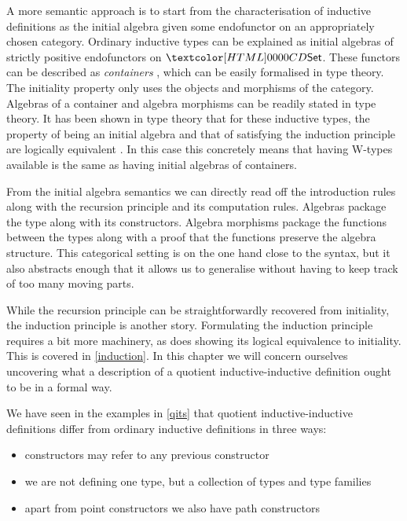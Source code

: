 A more semantic approach is to start from the characterisation of
inductive definitions as the initial algebra given some endofunctor on
an appropriately chosen category. Ordinary inductive types can be
explained as initial algebras of strictly positive endofunctors on
$\Set$. These functors can be described as \emph{containers}
\cite{Abbott2005}, which can be easily formalised in type theory. The
initiality property only uses the objects and morphisms of the
category. Algebras of a container and algebra morphisms can be readily
stated in type theory. It has been shown in type theory that for these
inductive types, the property of being an initial algebra and that of
satisfying the induction principle are logically equivalent
\cite{Awodey2012}. In this case this concretely means that having
W-types available is the same as having initial algebras of
containers.

From the initial algebra semantics we can directly read off the
introduction rules along with the recursion principle and its
computation rules. Algebras package the type along with its
constructors. Algebra morphisms package the functions between the
types along with a proof that the functions preserve the algebra
structure. This categorical setting is on the one hand close to the
syntax, but it also abstracts enough that it allows us to generalise
without having to keep track of too many moving parts.

While the recursion principle can be straightforwardly recovered from
initiality, the induction principle is another story. Formulating the
induction principle requires a bit more machinery, as does showing its
logical equivalence to initiality. This is covered in
\cref{induction}. In this chapter we will concern ourselves uncovering
what a description of a quotient inductive-inductive definition ought
to be in a formal way.

We have seen in the examples in \cref{qits} that quotient
inductive-inductive definitions differ from ordinary inductive
definitions in three ways:
%
\begin{itemize}
\item constructors may refer to any previous constructor
\item we are not defining one type, but a collection of types and type
  families
\item apart from point constructors we also have path constructors
\end{itemize}

